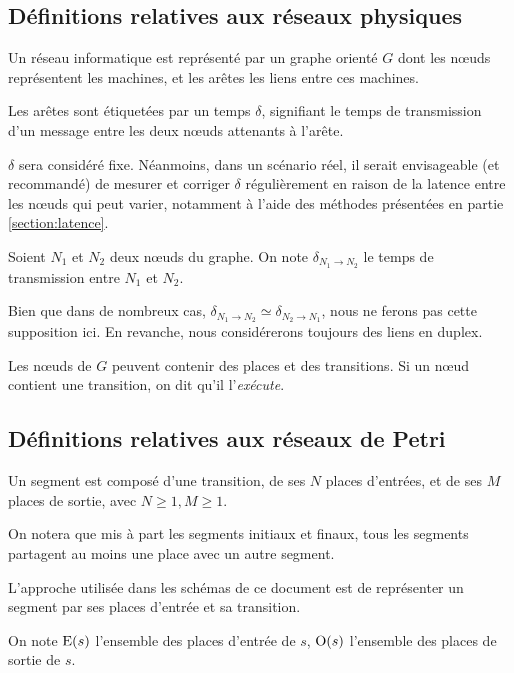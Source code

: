 \subsection{Définitions relatives aux réseaux physiques}
\begin{mydef}
Un réseau informatique est représenté par un graphe orienté $G$ dont les nœuds représentent les machines, et les arêtes les liens entre ces machines. 

Les arêtes sont étiquetées par un temps $\delta$, signifiant le temps de transmission d'un message entre les deux nœuds attenants à l'arête.
\end{mydef}
$\delta$ sera considéré fixe. Néanmoins, dans un scénario réel, il serait envisageable (et recommandé) de mesurer et corriger $\delta$ régulièrement en raison de la latence entre les nœuds qui peut varier, notamment à l'aide des méthodes présentées en partie \ref{section:latence}.
\\
\begin{mynot}
	Soient $N_1$ et $N_2$ deux nœuds du graphe. On note $\delta_{N_1 \rightarrow N_2}$ le temps de transmission entre $N_1$ et $N_2$.
\end{mynot} 

Bien que dans de nombreux cas, $\delta_{N_1 \rightarrow N_2} \simeq \delta_{N_2 \rightarrow N_1}$, nous ne ferons pas cette supposition ici. En revanche, nous considérerons toujours des liens en duplex.

Les nœuds de $G$ peuvent contenir des places et des transitions. Si un nœud contient une transition, on dit qu'il l'\textit{exécute}.

\subsection{Définitions relatives aux réseaux de Petri}
\begin{mydef}
Un segment est composé d'une transition, de ses $N$ places d'entrées, et de ses $M$ places de sortie, avec $N \geq 1, M \geq 1$.
\end{mydef}

On notera que mis à part les segments initiaux et finaux, tous les segments partagent au moins une place avec un autre segment.

L'approche utilisée dans les schémas de ce document est de représenter un segment par ses places d'entrée et sa transition.

\begin{mynot}
On note $\operatorname{E}(s)$ l'ensemble des places d'entrée de $s$, $\operatorname{O}(s)$ l'ensemble des places de sortie de $s$.
\end{mynot}


